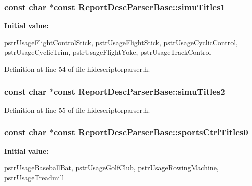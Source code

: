 \hypertarget{class_report_desc_parser_base_a934e0398770633c85a9e9f8cfb319f0a}{
\subsubsection[{simu\-Titles1}]{\setlength{\rightskip}{0pt plus 5cm}const char $\ast$const {\bf \-Report\-Desc\-Parser\-Base\-::simu\-Titles1}}}\label{class_report_desc_parser_base_a934e0398770633c85a9e9f8cfb319f0a}
{\bfseries \-Initial value\-:}
\begin{DoxyCode}
 {
        pstrUsageFlightControlStick,
        pstrUsageFlightStick,
        pstrUsageCyclicControl,
        pstrUsageCyclicTrim,
        pstrUsageFlightYoke,
        pstrUsageTrackControl
}
\end{DoxyCode}


\-Definition at line 54 of file hidescriptorparser.\-h.

\hypertarget{class_report_desc_parser_base_a5d9d0f1b2820bbfdddf6d54e1d826c83}{
\subsubsection[{simu\-Titles2}]{\setlength{\rightskip}{0pt plus 5cm}const char $\ast$const {\bf \-Report\-Desc\-Parser\-Base\-::simu\-Titles2}}}\label{class_report_desc_parser_base_a5d9d0f1b2820bbfdddf6d54e1d826c83}


\-Definition at line 55 of file hidescriptorparser.\-h.

\hypertarget{class_report_desc_parser_base_a4daf2daa3c18f446a66854475ca56a66}{
\subsubsection[{sports\-Ctrl\-Titles0}]{\setlength{\rightskip}{0pt plus 5cm}const char $\ast$const {\bf \-Report\-Desc\-Parser\-Base\-::sports\-Ctrl\-Titles0}}}\label{class_report_desc_parser_base_a4daf2daa3c18f446a66854475ca56a66}
{\bfseries \-Initial value\-:}
\begin{DoxyCode}
 {
        pstrUsageBaseballBat,
        pstrUsageGolfClub,
        pstrUsageRowingMachine,
        pstrUsageTreadmill
}
\end{DoxyCode}


